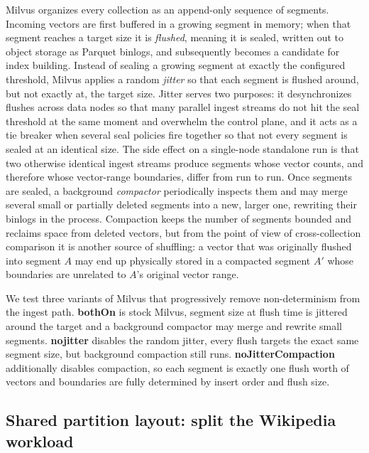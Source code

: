  Milvus organizes every
collection as an append-only sequence of segments. Incoming vectors are
first buffered in a growing segment in memory; when that segment reaches
a target size it is \emph{flushed}, meaning it is sealed, written out to
object storage as Parquet binlogs, and subsequently becomes a candidate
for index building. Instead of sealing a growing segment at exactly the configured
threshold, Milvus applies a random \emph{jitter} so that each segment
is flushed around, but not exactly at, the target size. Jitter serves
two purposes: it desynchronizes flushes across data nodes so that many
parallel ingest streams do not hit the seal threshold at the same
moment and overwhelm the control plane, and it acts as a tie breaker
when several seal policies fire together so that not every segment is
sealed at an identical size. The side effect on a single-node
standalone run is that two otherwise identical ingest streams produce
segments whose vector counts, and therefore whose vector-range boundaries,
differ from run to run. Once segments are sealed, a background
\emph{compactor} periodically inspects them and may merge several small
or partially deleted segments into a new, larger one, rewriting their
binlogs in the process. Compaction keeps the number of segments bounded
and reclaims space from deleted vectors, but from the point of view of
cross-collection comparison it is another source of shuffling: a vector
that was originally flushed into segment $A$ may end up physically
stored in a compacted segment $A'$ whose boundaries are unrelated to
$A$'s original vector range.

 We test three variants of Milvus that progressively
remove non-determinism from the ingest path.
\textbf{bothOn} is stock Milvus, segment size at flush time is jittered
around the target and a background compactor may merge and rewrite small
segments. \textbf{nojitter} disables the random jitter, every flush
targets the exact same segment size, but background compaction still
runs. \textbf{noJitterCompaction} additionally disables compaction, so
each segment is exactly one flush worth of vectors and boundaries are
fully determined by insert order and flush size.

\subsection{Shared partition layout: split the  Wikipedia workload}

